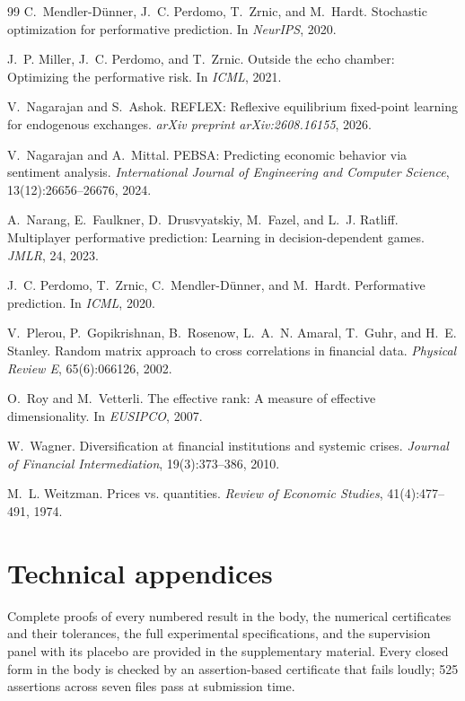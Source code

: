 \documentclass{article}
\theoremstyle{plain}
\theoremstyle{definition}
\begin{document}
\begin{thebibliography}{99}
 C.~Mendler-D\"unner, J.~C. Perdomo, T.~Zrnic, and M.~Hardt. Stochastic optimization for performative prediction. In \emph{NeurIPS}, 2020.

 J.~P. Miller, J.~C. Perdomo, and T.~Zrnic. Outside the echo chamber: Optimizing the performative risk. In \emph{ICML}, 2021.

 V.~Nagarajan and S.~Ashok. REFLEX: Reflexive equilibrium fixed-point learning for endogenous exchanges. \emph{arXiv preprint arXiv:2608.16155}, 2026.

 V.~Nagarajan and A.~Mittal. PEBSA: Predicting economic behavior via sentiment analysis. \emph{International Journal of Engineering and Computer Science}, 13(12):26656--26676, 2024.

 A.~Narang, E.~Faulkner, D.~Drusvyatskiy, M.~Fazel, and L.~J. Ratliff. Multiplayer performative prediction: Learning in decision-dependent games. \emph{JMLR}, 24, 2023.

 J.~C. Perdomo, T.~Zrnic, C.~Mendler-D\"unner, and M.~Hardt. Performative prediction. In \emph{ICML}, 2020.

 V.~Plerou, P.~Gopikrishnan, B.~Rosenow, L.~A.~N. Amaral, T.~Guhr, and H.~E. Stanley. Random matrix approach to cross correlations in financial data. \emph{Physical Review E}, 65(6):066126, 2002.

 O.~Roy and M.~Vetterli. The effective rank: A measure of effective dimensionality. In \emph{EUSIPCO}, 2007.

 W.~Wagner. Diversification at financial institutions and systemic crises. \emph{Journal of Financial Intermediation}, 19(3):373--386, 2010.

 M.~L. Weitzman. Prices vs. quantities. \emph{Review of Economic Studies}, 41(4):477--491, 1974.

\end{thebibliography}

\appendix

\section{Technical appendices}

Complete proofs of every numbered result in the body, the numerical certificates and their tolerances, the full experimental specifications, and the supervision panel with its placebo are provided in the supplementary material. Every closed form in the body is checked by an assertion-based certificate that fails loudly; 525 assertions across seven files pass at submission time.

\newpage

\end{document}
